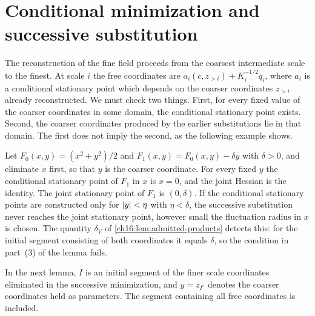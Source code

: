 \section{Conditional minimization and successive substitution}\label{ch16:sec:conditional}

The reconstruction of the fine field proceeds from the coarsest intermediate scale to the finest. At scale $i$ the free coordinates are $a_i(c,z_{>i})+K_i^{-1/2}q_i$, where $a_i$ is a conditional stationary point which depends on the coarser coordinates $z_{>i}$ already reconstructed. We must check two things. First, for every fixed value of the coarser coordinates in some domain, the conditional stationary point exists. Second, the coarser coordinates produced by the earlier substitutions lie in that domain. The first does not imply the second, as the following example shows.

\begin{example}\label{ch16:ex:conditional-domain}
Let $F_0(x,y)=(x^2+y^2)/2$ and $F_1(x,y)=F_0(x,y)-\delta y$ with $\delta>0$, and eliminate $x$ first, so that $y$ is the coarser coordinate. For every fixed $y$ the conditional stationary point of $F_1$ in $x$ is $x=0$, and the joint Hessian is the identity. The joint stationary point of $F_1$ is $(0,\delta)$. If the conditional stationary points are constructed only for $\lvert y\rvert<\eta$ with $\eta<\delta$, the successive substitution never reaches the joint stationary point, however small the fluctuation radius in $x$ is chosen. The quantity $\delta_V$ of \cref{ch16:lem:admitted-products} detects this: for the initial segment consisting of both coordinates it equals $\delta$, so the condition in part~(3) of the lemma fails.
\end{example}

In the next lemma, $I$ is an initial segment of the finer scale coordinates eliminated in the successive minimization, and $y=z_{I^c}$ denotes the coarser coordinates held as parameters. The segment containing all free coordinates is included.

